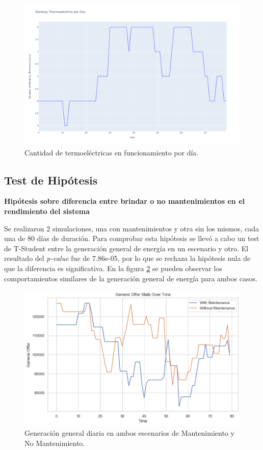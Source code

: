 \documentclass[twocolumn, fontsize=10pt]{article}
\begin{document}
  \begin{figure}[H]
    \centering
    \includegraphics[width=\columnwidth]{assets/workingperday.png}
    \caption{Cantidad de termoeléctricas en funcionamiento por día.}
    \label{fig:working}
    \end{figure}

\subsection{Test de Hipótesis}

\textbf{Hipótesis sobre diferencia entre brindar o no mantenimientos en el rendimiento del sistema}

Se realizaron 2 simulaciones, una con mantenimientos y otra sin los mismos, cada una de 80 días de duración.
Para comprobar esta hipótesis se llevó a cabo un test de T-Student entre la generación general de energía en un escenario y otro. El resultado
del \textit{p-value} fue de 7.86e-05, por lo que se rechaza la hipótesis nula de que la diferencia es significativa. En la figura \ref{fig:maintenancevsnomaintenance}
se pueden observar los comportamientos similares de la generación general de energía para ambos casos.

\begin{figure}[H]
  \centering
  \includegraphics[width=\columnwidth]{assets/maintenancevsnomaintenance.png}
  \caption{Generación general diaria en ambos escenarios de Mantenimiento y No Mantenimiento.}
  \label{fig:maintenancevsnomaintenance}
  \end{figure}
\end{document}
